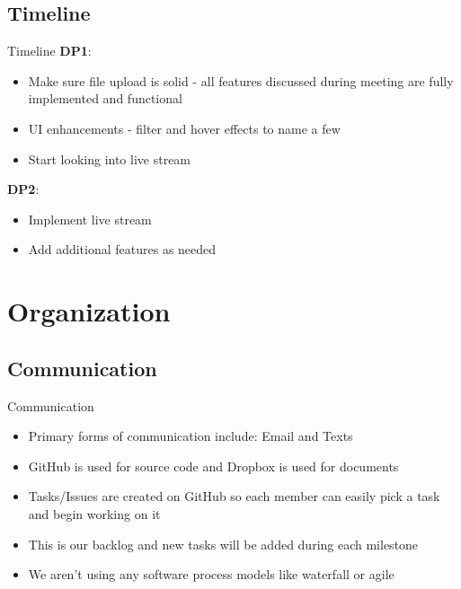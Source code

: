 \documentclass{beamer}
\begin{document}
\subsection{Timeline}
\begin{frame}{Timeline}
\textbf{DP1}:
\begin{itemize}
\item Make sure file upload is solid - all features discussed during meeting are fully implemented and functional
\item UI enhancements - filter and hover effects to name a few
\item Start looking into live stream
\end{itemize}
\textbf{DP2}:
\begin{itemize}
\item Implement live stream
\item Add additional features as needed
\end{itemize}
\end{frame}


\section{Organization}

\subsection{Communication}
\begin{frame}{Communication}
\begin{itemize}
\item Primary forms of communication include: Email and Texts
\item GitHub is used for source code and Dropbox is used for documents
\item Tasks/Issues are created on GitHub so each member can easily pick a task and begin working on it
\item This is our backlog and new tasks will be added during each milestone
\item We aren't using any software process models like waterfall or agile
\end{itemize}
\end{frame}
\end{document}
